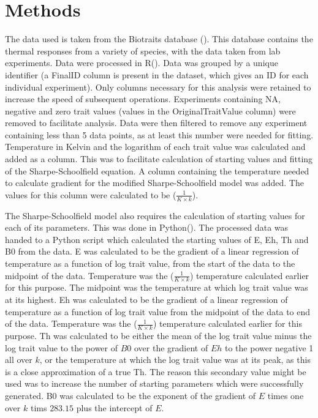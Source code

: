 \documentclass[11pt]{article}
\begin{document}
\section{Methods}
The data used is taken from the Biotraits database (\cite{Dell2011}). This database contains the thermal responses from a variety of species, with the data taken from lab experiments.
Data were processed in R(\cite{R2019}). Data was grouped by a unique identifier (a FinalID column is present in the dataset, which gives an ID for each individual experiment). Only columns necessary for this analysis were retained to increase the speed of subsequent operations. Experiments containing NA, negative and zero trait values (values in the OriginalTraitValue column) were removed to facilitate analysis. Data were then filtered to remove any experiment containing less than 5 data points, as at least this number were needed for fitting.  
Temperature in Kelvin and the logarithm of each trait value was calculated and added as a column. This was to facilitate calculation of starting values and fitting of the Sharpe-Schoolfield equation. 
A column containing the temperature needed to calculate gradient for the modified Sharpe-Schoolfield model was added. The values for this column were calculated to be ($\frac{ 1}{K \times k}$).

The Sharpe-Schoolfield model also requires the calculation of starting values for each of its parameters. This was done in Python(\cite{Python2019}). The processed data was handed to a Python script which calculated the starting values of E, Eh, Th and B0 from the data. 
E was calculated to be the gradient of a linear regression of temperature as a function of log trait value, from the start of the data to the midpoint of the data. Temperature was the ($\frac{ 1}{K \times k}$) temperature calculated earlier for this purpose. The midpoint was the temperature at which log trait value was at its highest.
Eh was calculated to be the gradient of a linear regression of temperature as a function of log trait value from the midpoint of the data to end of the data. Temperature was the ($\frac{ 1}{K \times k}$) temperature calculated earlier for this purpose. 
Th was calculated to be either the mean of the log trait value minus the log trait value to the power of $B0$ over the gradient of $Eh$ to the power negative 1 all over $k$, 
or the temperature at which the log trait value was at its peak, as this is a close approximation of a true Th. The reason this secondary value might be used was to increase the number of starting parameters which were successfully generated. 
B0 was calculated to be the exponent of the gradient of $E$ times one over $k$ tims $283.15$ plus the intercept of $E$. 
\end{document}
